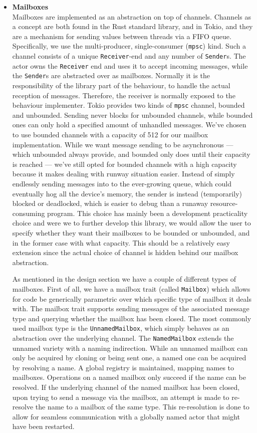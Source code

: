 \documentclass[a4paper]{article}
\begin{document}
\begin{itemize}
\item{\bf Mailboxes} \\
Mailboxes are implemented as an abstraction on top of channels. Channels as a
concept are both found in the Rust standard library, and in Tokio, and they are a
mechanism for sending values between threads via a FIFO queue. Specifically, we
use the multi-producer, single-consumer (\texttt{mpsc}) kind. Such a channel
consists of a unique \texttt{Receiver}-end and any number of \texttt{Sender}s.
The actor owns the \texttt{Receiver} end and uses it to accept incoming
messages, while the \texttt{Sender}s are abstracted over as mailboxes. Normally
it is the responsibility of the library part of the behaviour, to handle the
actual reception of messages. Therefore, the receiver is normally exposed to the
behaviour implementer.
Tokio
provides two kinds of \texttt{mpsc} channel, bounded and unbounded. Sending
never blocks for unbounded channels, while bounded ones can only hold a
specified amount of unhandled messages. We've chosen to use bounded channels
with a capacity of 512 for our mailbox implementation. While we want message
sending to be asynchronous --- which unbounded always provide, and bounded only
does until their capacity is reached --- we've still opted for bounded channels
with a high capacity because it makes dealing with runway situation easier.
Instead of simply endlessly sending messages into to the ever-growing queue,
which could eventually hog all the device's memory, the sender is instead
(temporarily) blocked or deadlocked, which is easier to debug than a runaway
resource-consuming program.
This choice has mainly been a development practicality choice and were we to
further develop this library, we would allow the user to specify whether they
want their mailboxes to be bounded or unbounded, and in the former case with
what capacity. This should be a relatively easy extension since the actual
choice of channel is hidden behind our mailbox abstraction.

As mentioned in the design section we have a couple of different types of
mailboxes. First of all, we have a mailbox trait (called \texttt{Mailbox}) which
allows for code be generically parametric over which specific type of mailbox it
deals with. The mailbox trait supports sending messages of the associated
message type and querying whether the mailbox has been closed. The most commonly
used mailbox type is the \texttt{UnnamedMailbox}, which simply behaves as an
abstraction over the underlying channel. The \texttt{NamedMailbox} extends the
unnamed variety with a naming indirection. While an unnamed mailbox can only be
acquired by cloning or being sent one, a named one can be acquired by resolving
a name. A global registry is maintained, mapping names to mailboxes. Operations
on a named mailbox only succeed if the name can be
resolved. If the underlying channel of the named mailbox has been closed, upon
trying to send a message via the mailbox, an attempt is made to re-resolve the name to a
mailbox of the same type. This re-resolution is done to allow for seamless
communication with a globally named actor that might have been restarted.


\end{itemize}
\end{document}
